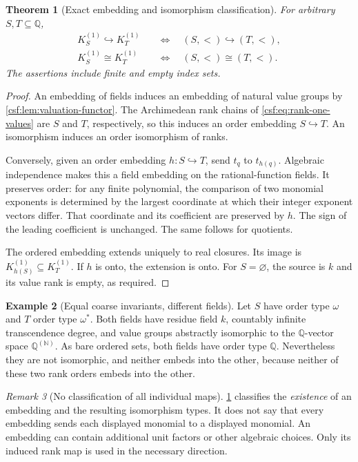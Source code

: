 \documentclass[11pt,a4paper]{article}
\numberwithin{equation}{section}
\newtheorem{theorem}{Theorem}[section]
\theoremstyle{definition}
\newtheorem{example}[theorem]{Example}
\theoremstyle{remark}
\newtheorem{remark}[theorem]{Remark}
\newcommand{\N}{\mathbb N}
\newcommand{\Q}{\mathbb Q}
\newcommand{\emb}{\hookrightarrow}
\newcommand{\Kone}{K^{(1)}}
\begin{document}
\begin{theorem}[Exact embedding and isomorphism classification]
\label{csf:thm:rank-one-classification}
For arbitrary $S,T\subseteq\Q$,
\begin{align}
 \Kone_S\emb\Kone_T
 &\quad\Longleftrightarrow\quad (S,<)\emb(T,<),
 \label{csf:eq:embedding-classification}\\
 \Kone_S\cong\Kone_T
 &\quad\Longleftrightarrow\quad (S,<)\cong(T,<).
 \label{csf:eq:iso-classification}
\end{align}
The assertions include finite and empty index sets.
\end{theorem}
\begin{proof}
An embedding of fields induces an embedding of natural value groups by
\cref{csf:lem:valuation-functor}. The Archimedean rank chains of
\eqref{csf:eq:rank-one-values} are $S$ and $T$, respectively, so this induces
an order embedding $S\emb T$. An isomorphism induces an order isomorphism
of ranks.

Conversely, given an order embedding $h:S\emb T$, send $t_q$ to $t_{h(q)}$.
Algebraic independence makes this a field embedding on the rational-function
fields. It preserves order: for any finite polynomial, the comparison of
two monomial exponents is determined by the largest coordinate at which
their integer exponent vectors differ. That coordinate and its coefficient
are preserved by $h$. The sign of the leading coefficient is unchanged.
The same follows for quotients.

The ordered embedding extends uniquely to real closures. Its image is
$\Kone_{h(S)}\subseteq\Kone_T$. If $h$ is onto, the extension is onto.
For $S=\varnothing$, the source is $k$ and its value rank is empty, as
required.
\end{proof}

\begin{example}[Equal coarse invariants, different fields]
Let $S$ have order type $\omega$ and $T$ order type $\omega^*$.
Both fields have residue field $k$, countably infinite transcendence degree,
and value groups abstractly isomorphic to the $\Q$-vector space
$\Q^{(\N)}$. As bare ordered sets, both fields have order type $\Q$.
Nevertheless they are not isomorphic, and neither embeds into the other,
because neither of these two rank orders embeds into the other.
\end{example}

\begin{remark}[No classification of all individual maps]
\cref{csf:thm:rank-one-classification} classifies the \emph{existence} of an
embedding and the resulting isomorphism types. It does not say that every
embedding sends each displayed monomial to a displayed monomial. An
embedding can contain additional unit factors or other algebraic choices.
Only its induced rank map is used in the necessary direction.
\end{remark}
\end{document}
